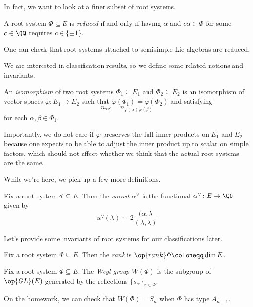\documentclass[../notes.tex]{subfiles}
\begin{document}
In fact, we want to look at a finer subset of root systems.
\begin{definition}[reduced]
	A root system $\Phi\subseteq E$ is \textit{reduced} if and only if having $\alpha$ and $c\alpha\in\Phi$ for some $c\in\QQ$ requires $c\in\{\pm1\}$.
\end{definition}
\begin{example}
	One can check that root systems attached to semisimple Lie algebras are reduced.
\end{example}
We are interested in classification results, so we define some related notions and invariants.
\begin{definition}[isomorphism]
	An \textit{isomorphism} of two root systems $\Phi_1\subseteq E_1$ and $\Phi_2\subseteq E_2$ is an isomorphism of vector spaces $\varphi\colon E_1\to E_2$ such that $\varphi(\Phi_1)=\varphi(\Phi_2)$ and satisfying
	\[n_{\alpha\beta}=n_{\varphi(\alpha)\varphi(\beta)}\]
	for each $\alpha,\beta\in\Phi_1$.
\end{definition}
\begin{remark}
	Importantly, we do not care if $\varphi$ preserves the full inner products on $E_1$ and $E_2$ because one expects to be able to adjust the inner product up to scalar on simple factors, which should not affect whether we think that the actual root systems are the same.
\end{remark}
While we're here, we pick up a few more definitions.
\begin{definition}[coroot]
	Fix a root system $\Phi\subseteq E$. Then the \textit{coroot} $\alpha^\lor$ is the functional $\alpha^\lor\colon E\to\QQ$ given by
	\[\alpha^\lor(\lambda)\coloneqq2\frac{(\alpha,\lambda}{(\lambda,\lambda)}\]
\end{definition}
Let's provide some invariants of root systems for our classifications later.
\begin{definition}[rank]
	Fix a root system $\Phi\subseteq E$. Then the \textit{rank} is $\op{rank}\Phi\coloneqq\dim E$.
\end{definition}
\begin{definition}
	Fix a root system $\Phi\subseteq E$. The \textit{Weyl group} $W(\Phi)$ is the subgroup of $\op{GL}(E)$ generated by the reflections $\{s_\alpha\}_{\alpha\in\Phi}$.
\end{definition}
\begin{example}
	On the homework, we can check that $W(\Phi)=S_n$ when $\Phi$ has type $A_{n-1}$.
\end{example}
\end{document}

